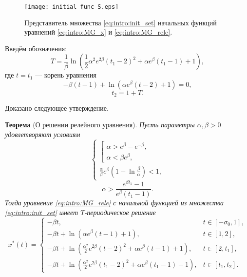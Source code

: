 \begin{figure}
	\centering
	\texttt{[image: initial\_func\_S.eps]}
	\caption{Представитель множества \eqref{eq:intro:init_set} начальных функций уравнений \eqref{eq:intro:MG_x} и \eqref{eq:intro:MG_rele}.}
	\label{fig:intro:initial_funcs:ch1}
\end{figure}

Введём обозначения:
\begin{equation}
	\label{eq:intro:T}
	T = \frac{1}{\beta} \ln\left(\frac{1}{2}\alpha^2e^{2\beta}(t_1 - 2)^2 + \alpha e^{\beta}(t_1 - 1) + 1\right),
\end{equation}
где $t = t_1$ --- корень уравнения 
\begin{equation}
	\label{eq:intro:t1_cond_exp}
	-\beta(t - 1) + \ln(\alpha e^{\beta}(t - 2) + 1) = 0,
\end{equation}
\begin{equation}
	\label{eq:intro:t2_period}
	t_2 = 1 + T.
\end{equation}

Доказано следующее утверждение.

\textbf{Теорема} (О решении релейного уравнения). \textit{
	Пусть параметры $\alpha, \beta > 0$ удовлетворяют условиям
	\begin{equation}
		\label{eq:intro:cond_alpha1}
		\begin{cases}
			\left[
			\begin{array}{ll}
				\alpha > e^{\beta} - e^{-\beta},\\
				\alpha < \beta e^{\beta},
			\end{array}
			\right.\\
			\frac{\alpha}{\beta}e^{\beta}\left(1 + \ln\frac{\beta}{\alpha}\right) < 1,
		\end{cases}
	\end{equation}
	\begin{equation}
		\label{eq:intro:cond_alpha2}
		\alpha > \dfrac{e^{\beta t_1} - 1}{e^{\beta}(t_1 - 1)}.
	\end{equation}
	Тогда уравнение \eqref{eq:intro:MG_rele} с начальной функцией из множества \eqref{eq:intro:init_set} имеет $T$-периодическое решение
	\small
	\begin{equation}
		\label{eq:intro:sol_x_star}
		x^*(t)= 
		\begin{cases}
			-\beta t, & t\in[-\sigma_0, 1],\\
			-\beta t +\ln(\alpha e^{\beta}(t - 1)+1), & t\in[1, 2],\\
			-\beta t + \ln(\frac{\alpha^2}{2}e^{2\beta}(t - 2)^2+\alpha e^{\beta}(t - 1)+1), & t\in[2, t_1],\\
			-\beta t + \ln(\frac{\alpha^2}{2}e^{2\beta}(t_1 - 2)^2+\alpha e^{\beta}(t_1 - 1) + 1), & t\in[t_1, t_2].
		\end{cases}
	\end{equation}
	\normalsize
}

